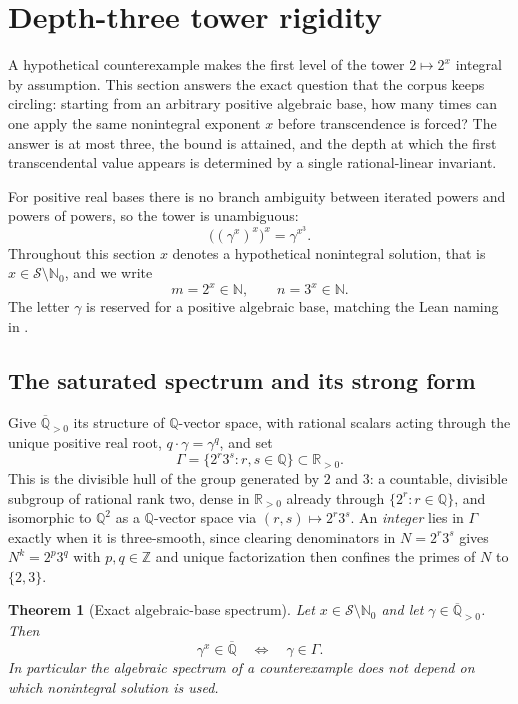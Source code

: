 \documentclass[11pt,oneside]{article}
\newtheorem{theorem}{Theorem}[section]
\theoremstyle{definition}
\theoremstyle{remark}
\newcommand{\N}{\mathbb N}
\newcommand{\Nzero}{\mathbb N_0}
\newcommand{\Z}{\mathbb Z}
\newcommand{\Q}{\mathbb Q}
\newcommand{\R}{\mathbb R}
\newcommand{\Abar}{\overline{\mathbb Q}}
\newcommand{\Sol}{\mathcal S}
\newcommand{\Apos}{\Abar_{>0}}
\newcommand{\GammaSat}{\Gamma}
\newcommand{\lean}[1]{\texttt{\detokenize{#1}}}
\begin{document}
\section{Depth-three tower rigidity}
\label{sec:tower}

A hypothetical counterexample makes the first level of the tower $2\mapsto2^x$ integral by
assumption.  This section answers the exact question that the corpus keeps circling: starting
from an arbitrary positive algebraic base, how many times can one apply the same nonintegral
exponent $x$ before transcendence is forced?  The answer is at most three, the bound is
attained, and the depth at which the first transcendental value appears is determined by a
single rational-linear invariant.

For positive real bases there is no branch ambiguity between iterated powers and powers of
powers, so the tower is unambiguous:
\[
 \bigl((\gamma^x)^x\bigr)^x=\gamma^{x^3}.
\]
Throughout this section $x$ denotes a hypothetical nonintegral solution, that is
$x\in\Sol\setminus\Nzero$, and we write
\[
 m=2^x\in\N,\qquad n=3^x\in\N .
\]
The letter $\gamma$ is reserved for a positive algebraic base, matching the Lean naming in
\lean{AlgebraicBaseUnitPower}.

\subsection{The saturated spectrum and its strong form}

Give $\Apos$ its structure of $\Q$-vector space, with rational scalars acting through the
unique positive real root, $q\cdot\gamma=\gamma^q$, and set
\[
 \GammaSat=\{2^r3^s:r,s\in\Q\}\subset\R_{>0}.
\]
This is the divisible hull of the group generated by $2$ and $3$: a countable, divisible
subgroup of rational rank two, dense in $\R_{>0}$ already through $\{2^r:r\in\Q\}$, and
isomorphic to $\Q^2$ as a $\Q$-vector space via $(r,s)\mapsto2^r3^s$.  An \emph{integer} lies
in $\GammaSat$ exactly when it is three-smooth, since clearing denominators in $N=2^r3^s$
gives $N^k=2^p3^q$ with $p,q\in\Z$ and unique factorization then confines the primes of $N$
to $\{2,3\}$.

\begin{theorem}[Exact algebraic-base spectrum]
\label{tw:spectrum}
Let $x\in\Sol\setminus\Nzero$ and let $\gamma\in\Apos$.  Then
\[
 \gamma^x\in\Abar
 \quad\Longleftrightarrow\quad
 \gamma\in\GammaSat .
\]
In particular the algebraic spectrum of a counterexample does not depend on which nonintegral
solution is used.
\end{theorem}
\end{document}
